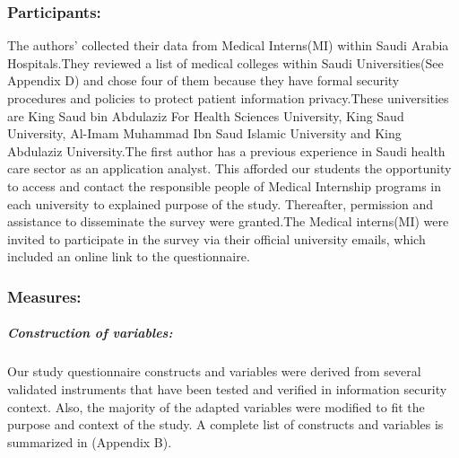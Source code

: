 \subsubsection{Participants:}
The authors’ collected their data from Medical Interns(MI) within Saudi Arabia Hospitals.They reviewed a list of medical colleges within Saudi Universities(See Appendix D) and chose four of them because they have formal security procedures and policies to protect patient information privacy.These universities are King Saud bin Abdulaziz For Health Sciences University, King Saud University, Al-Imam Muhammad Ibn Saud Islamic University and King Abdulaziz University.The first author has a previous experience in Saudi health care sector as an application analyst. This afforded our students the opportunity to access and contact the responsible people of Medical Internship programs in each university to explained purpose of the study. Thereafter, permission and assistance to disseminate the survey were granted.The Medical interns(MI) were invited to participate in the survey via their official university emails, which included an online link to the questionnaire. 
\\
\subsubsection{Measures:}
\subparagraph{Construction of variables:} Our study questionnaire constructs and variables were derived from several validated instruments that have been tested and verified in information security context. Also, the majority of the adapted variables were modified to fit the purpose and context of the study. A complete list of constructs and variables is summarized in (Appendix B).

